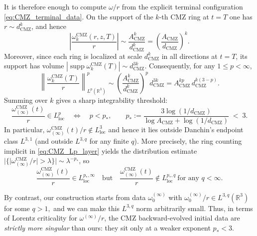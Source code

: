 \documentclass[reqno,11pt]{amsart}
\newcommand{\supp}{\operatorname{supp}}
\begin{document}
It is therefore enough to compute $\omega/r$ from the explicit terminal configuration
\eqref{eq:CMZ_terminal_data}.  On the support of the $k$-th CMZ ring at $t=T$ one has
$r\sim d_{\mathrm{CMZ}}^{k}$, and hence
\begin{equation*}
\left|\frac{\omega^{\mathrm{CMZ}}_{k}(r,z,T)}{r}\right|
\sim
\frac{A_{\mathrm{CMZ}}^{k}}{d_{\mathrm{CMZ}}^{k}}
=\left(\frac{A_{\mathrm{CMZ}}}{d_{\mathrm{CMZ}}}\right)^{k}.
\end{equation*}
Moreover, since each ring is localized at scale $d_{\mathrm{CMZ}}^{k}$ in all directions at $t=T$,
its support has volume $|\supp \omega^{\mathrm{CMZ}}_{k}(T)|\sim d_{\mathrm{CMZ}}^{3k}$.
Consequently, for any $1\le p<\infty$,
\begin{equation}\label{eq:CMZ_Lp_layer}
\left\|\frac{\omega^{\mathrm{CMZ}}_{k}(T)}{r}\right\|_{L^{p}(\mathbb{R}^3)}^{p}
\sim
\left(\frac{A_{\mathrm{CMZ}}^{k}}{d_{\mathrm{CMZ}}^{k}}\right)^{p}
\,d_{\mathrm{CMZ}}^{3k}
=
A_{\mathrm{CMZ}}^{kp}\,d_{\mathrm{CMZ}}^{k(3-p)}.
\end{equation}
Summing over $k$ gives a sharp integrability threshold:
\begin{equation*}
\frac{\omega^{\mathrm{CMZ}}_{(\infty)}(t)}{r}\in L^{p}_{\mathrm{loc}}
\quad\Longleftrightarrow\quad
p<p_\ast,
\qquad
p_\ast:=\frac{3\log(1/d_{\mathrm{CMZ}})}{\log A_{\mathrm{CMZ}}+\log(1/d_{\mathrm{CMZ}})}
\;<\;3.
\end{equation*}
In particular, $\omega_{(\infty)}^{\mathrm{CMZ}}(t)/r\notin L^{3}_{\mathrm{loc}}$ and hence it lies  outside
Danchin's endpoint class $L^{3,1}$ (and outside $L^{3,q}$ for any finite $q$).  More precisely,
the ring counting implicit in \eqref{eq:CMZ_Lp_layer} yields the distribution estimate
$|\{|\omega^{\mathrm{CMZ}}_{(\infty)}/r|>\lambda\}|\sim \lambda^{-p_\ast}$, so
\begin{equation}\label{eq:CMZ_Lorentz_membership}
\frac{\omega^{\mathrm{CMZ}}_{(\infty)}(t)}{r}\in L^{p_\ast,\infty}_{\mathrm{loc}}
\quad\text{but}\quad
\frac{\omega^{\mathrm{CMZ}}_{(\infty)}(t)}{r}\notin L^{p_\ast,q}_{\mathrm{loc}}\ \text{for any }q<\infty.
\end{equation}

By contrast, our construction starts from  data $\omega_0^{(\infty)}$ with
$\omega_0^{(\infty)}/r\in L^{3,q}(\mathbb{R}^3)$ for some $q>1,$
and we can make this $L^{3,q}$ norm arbitrarily small.
Thus, in terms of Lorentz criticality for $\omega^{(\infty)}/r$, the CMZ backward-evolved initial data are \emph{strictly more
singular} than ours: they sit only at a weaker exponent $p_\ast<3$.
\end{document}
